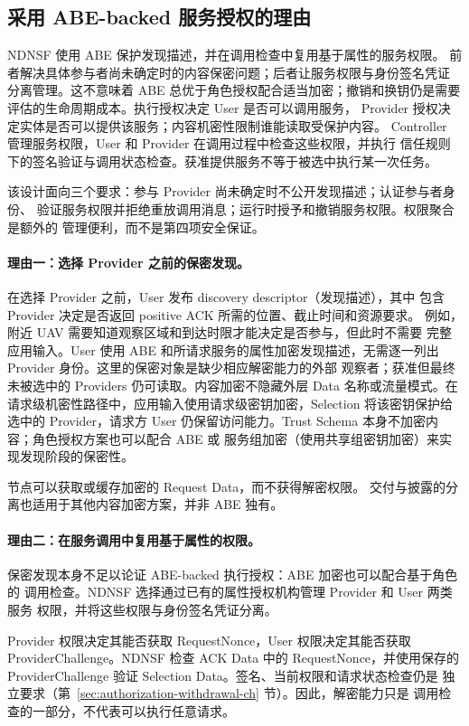 \subsection{采用 ABE-backed 服务授权的理由}
\label{sec:abe-rationale-ch}

NDNSF 使用 ABE 保护发现描述，并在调用检查中复用基于属性的服务权限。
前者解决具体参与者尚未确定时的内容保密问题；后者让服务权限与身份签名凭证
分离管理。这不意味着 ABE 总优于角色授权配合适当加密；撤销和换钥仍是需要
评估的生命周期成本。执行授权决定 User 是否可以调用服务，
Provider 授权决定实体是否可以提供该服务；内容机密性限制谁能读取受保护内容。
Controller 管理服务权限，User 和 Provider 在调用过程中检查这些权限，并执行
信任规则下的签名验证与调用状态检查。获准提供服务不等于被选中执行某一次任务。

该设计面向三个要求：参与 Provider 尚未确定时不公开发现描述；认证参与者身份、
验证服务权限并拒绝重放调用消息；运行时授予和撤销服务权限。权限聚合是额外的
管理便利，而不是第四项安全保证。

\paragraph{理由一：选择 Provider 之前的保密发现。}
在选择 Provider 之前，User 发布 discovery descriptor（发现描述），其中
包含 Provider 决定是否返回 positive ACK 所需的位置、截止时间和资源要求。
例如，附近 UAV 需要知道观察区域和到达时限才能决定是否参与，但此时不需要
完整应用输入。User 使用 ABE 和所请求服务的属性加密发现描述，无需逐一列出
Provider 身份。这里的保密对象是缺少相应解密能力的外部
观察者；获准但最终未被选中的 Providers 仍可读取。内容加密不隐藏外层 Data
名称或流量模式。在请求级机密性路径中，应用输入使用请求级密钥加密，Selection
将该密钥保护给选中的 Provider，请求方 User 仍保留访问能力。Trust Schema
本身不加密内容；角色授权方案也可以配合 ABE 或
服务组加密（使用共享组密钥加密）来实现发现阶段的保密性。

节点可以获取或缓存加密的 Request Data，而不获得解密权限。
交付与披露的分离也适用于其他内容加密方案，并非 ABE 独有。

\paragraph{理由二：在服务调用中复用基于属性的权限。}
保密发现本身不足以论证 ABE-backed 执行授权：ABE 加密也可以配合基于角色的
调用检查。NDNSF 选择通过已有的属性授权机构管理 Provider 和 User 两类服务
权限，并将这些权限与身份签名凭证分离。

Provider 权限决定其能否获取 RequestNonce，User 权限决定其能否获取
ProviderChallenge。NDNSF 检查 ACK Data 中的 RequestNonce，并使用保存的
ProviderChallenge 验证 Selection Data。签名、当前权限和请求状态检查仍是
独立要求（第~\ref{sec:authorization-withdrawal-ch} 节）。因此，解密能力只是
调用检查的一部分，不代表可以执行任意请求。

